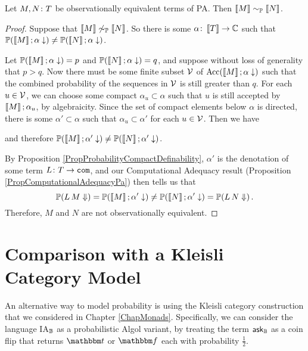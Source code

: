 \begin{theorem}
  Let $M,N \colon T$ be observationally equivalent terms of PA.  
  Then $\left\llbracket M\right\rrbracket \sim_{\mathbb{P}} \left\llbracket N\right\rrbracket$.
  \label{TheFullAbstractionPa}
\end{theorem}
\begin{proof}
  Suppose that $\left\llbracket M\right\rrbracket \not\sim_{\mathbb{P}} \left\llbracket N\right\rrbracket$.
  So there is some $\alpha \colon \left\llbracket T\right\rrbracket \to \mathbb{C}$ such that $\mathbb{P}(\left\llbracket M\right\rrbracket;\alpha\downarrow) \ne \mathbb{P}(\left\llbracket N\right\rrbracket;\alpha\downarrow)$.

  Let $\mathbb{P}(\left\llbracket M\right\rrbracket;\alpha\downarrow) = p$ and $\mathbb{P}(\left\llbracket N\right\rrbracket;\alpha\downarrow) = q$, and suppose without loss of generality that $p>q$.
  Now there must be some finite subset ${\mathcal{V}}$ of $\operatorname{Acc}(\left\llbracket M\right\rrbracket;\alpha\downarrow)$ such that the combined probability of the sequences in ${\mathcal{V}}$ is still greater than $q$.  
  For each $u\in {\mathcal{V}}$, we can choose some compact $\alpha_u\subset \alpha$ such that $u$ is still accepted by $\left\llbracket M\right\rrbracket;\alpha_u$, by algebraicity.
  Since the set of compact elements below $\alpha$ is directed, there is some $\alpha'\subset \alpha$ such that $\alpha_u\subset \alpha'$ for each $u\in {\mathcal{V}}$.  
  Then we have
  and therefore $\mathbb{P}(\left\llbracket M\right\rrbracket;\alpha'\downarrow) \ne \mathbb{P}(\left\llbracket N\right\rrbracket;\alpha'\downarrow)$.

  By Proposition \ref{PropProbabilityCompactDefinability}, $\alpha'$ is the denotation of some term $L\colon T \to {\mathtt{com}}$, and our Computational Adequacy result (Proposition \ref{PropComputationalAdequacyPa}) then tells us that 
  \[
    \mathbb{P}(L\,M\Downarrow)=\mathbb{P}(\left\llbracket M\right\rrbracket;\alpha'\downarrow)\ne\mathbb{P}(\left\llbracket N\right\rrbracket;\alpha'\downarrow) = \mathbb{P}(L\,N\Downarrow)\,.
    \]
  Therefore, $M$ and $N$ are not observationally equivalent.
\end{proof}

\section{Comparison with a Kleisli Category Model}

An alternative way to model probability is using the Kleisli category construction that we considered in Chapter \ref{ChapMonads}.  
Specifically, we can consider the language IA${}_{\mathbb{B}}$ as a probabilistic Algol variant, by treating the term $\operatorname{{\mathsf{ask}}}_{\mathbb{B}}$ as a coin flip that returns $\true$ or $\false$ each with probability $\frac12$.

